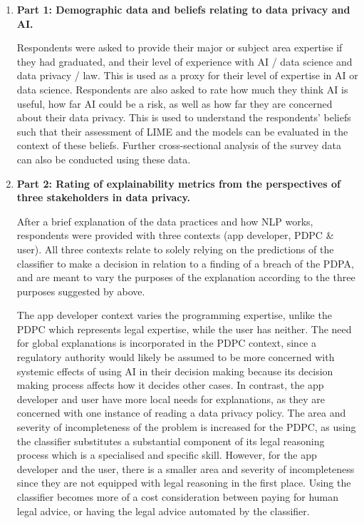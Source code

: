\begin{enumerate}[listparindent=0.5cm]
	\item \textbf{Part 1: Demographic data and beliefs relating to data privacy and AI.} 
	
	Respondents were asked to provide their major or subject area expertise if they had graduated, and their level of experience with AI / data science and data privacy / law. This is used as a proxy for their level of expertise in AI or data science. Respondents are also asked to rate how much they think AI is useful, how far AI could be a risk, as well as how far they are concerned about their data privacy. This is used to understand the respondents' beliefs such that their assessment of LIME and the models can be evaluated in the context of these beliefs. Further cross-sectional analysis of the survey data can also be conducted using these data.
	
	\item \textbf{Part 2: Rating of explainability metrics from the perspectives of three stakeholders in data privacy.} 
	
	After a brief explanation of the data practices and how NLP works, respondents were provided with three contexts (app developer, PDPC \& user). All three contexts relate to solely relying on the predictions of the classifier to make a decision in relation to a finding of a breach of the PDPA, and are meant to vary the purposes of the explanation according to the three purposes suggested by \cite{doshi-velez2017} above. 
	
	The app developer context varies the programming expertise, unlike the PDPC which represents legal expertise, while the user has neither. The need for global explanations is incorporated in the PDPC context, since a regulatory authority would likely be assumed to be more concerned with systemic effects of using AI in their decision making because its decision making process affects how it decides other cases. In contrast, the app developer and user have more local needs for explanations, as they are concerned with one instance of reading a data privacy policy. The area and severity of incompleteness of the problem is increased for the PDPC, as using the classifier substitutes a substantial component of its legal reasoning process which is a specialised and specific skill. However, for the app developer and the user, there is a smaller area and severity of incompleteness since they are not equipped with legal reasoning in the first place. Using the classifier becomes more of a cost consideration between paying for human legal advice, or having the legal advice automated by the classifier.
	

\end{enumerate}
